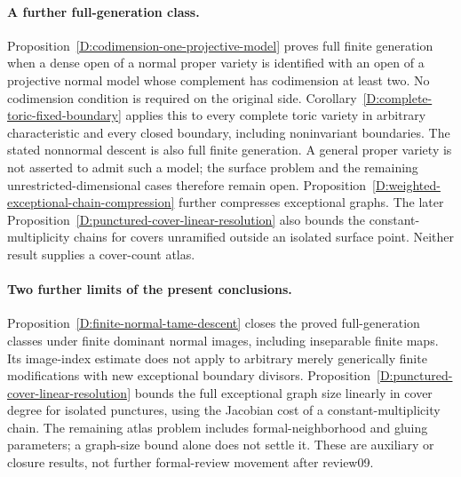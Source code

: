 \paragraph{A further full-generation class.}
Proposition~\ref{D:codimension-one-projective-model} proves full finite
generation when a dense open of a normal proper variety is identified
with an open of a projective normal model whose complement has
codimension at least two. No codimension condition is required on
the original side. Corollary~\ref{D:complete-toric-fixed-boundary}
applies this to every complete toric variety in arbitrary characteristic
and every closed boundary, including noninvariant boundaries. The stated
nonnormal descent is also full finite generation. A general proper
variety is not asserted to admit such a model; the surface problem and
the remaining unrestricted-dimensional cases therefore remain open.
Proposition~\ref{D:weighted-exceptional-chain-compression} further
compresses exceptional graphs. The later
Proposition~\ref{D:punctured-cover-linear-resolution} also bounds the
constant-multiplicity chains for covers unramified outside an isolated
surface point. Neither result supplies a cover-count atlas.


\paragraph{Two further limits of the present conclusions.}
Proposition~\ref{D:finite-normal-tame-descent} closes the proved
full-generation classes under finite dominant normal images, including
inseparable finite maps. Its image-index estimate does not apply to
arbitrary merely generically finite modifications with new exceptional
boundary divisors. Proposition~\ref{D:punctured-cover-linear-resolution}
bounds the full exceptional graph size linearly in cover degree for
isolated punctures, using the Jacobian cost of a constant-multiplicity
chain. The remaining atlas problem includes formal-neighborhood and
gluing parameters; a graph-size bound alone does not settle it.
These are auxiliary or closure results, not further formal-review
movement after review09.


